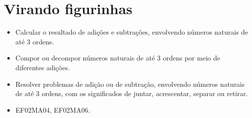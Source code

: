 \chapter{Virando figurinhas}



\begin{itemize}
\item Calcular o resultado de adições e subtrações, envolvendo números naturais de até 3 ordens.

\item Compor ou decompor números naturais de até 3 ordens por meio de diferentes adições.

\item Resolver problemas de adição ou de subtração, envolvendo números
naturais de até 3 ordens, com os significados de juntar, acrescentar, separar ou retirar.
\end{itemize}


\begin{itemize}
\item EF02MA04, EF02MA06.
\end{itemize}

